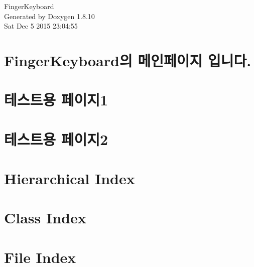\documentclass[twoside]{book}
\newcommand{\+}{\discretionary{\mbox{\scriptsize$\hookleftarrow$}}{}{}}
\newcommand{\clearemptydoublepage}{%
  \newpage{\pagestyle{empty}\cleardoublepage}%
}
\begin{document}
\hypersetup{pageanchor=false,
             bookmarks=true,
             bookmarksnumbered=true,
             pdfencoding=unicode
            }
\begin{titlepage}
\vspace*{7cm}
\begin{center}%
{\Large Finger\+Keyboard }\\
\vspace*{1cm}
{\large Generated by Doxygen 1.8.10}\\
\vspace*{0.5cm}
{\small Sat Dec 5 2015 23:04:55}\\
\end{center}
\end{titlepage}
\clearemptydoublepage
\tableofcontents
\clearemptydoublepage
{}
\hypersetup{pageanchor=true}

\chapter{Finger\+Keyboard의 메인페이지 입니다.}
\label{index}\hypertarget{index}{}
\chapter{테스트용 페이지1}
\label{page1}
\hypertarget{page1}{}

\chapter{테스트용 페이지2}
\label{page2}
\hypertarget{page2}{}

\chapter{Hierarchical Index}

\chapter{Class Index}

\chapter{File Index}

\end{document}

